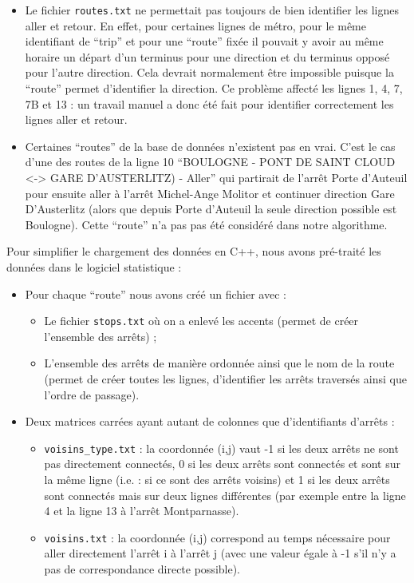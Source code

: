 \documentclass[,french]{article}
\begin{document}
\begin{itemize}
\item
  Le fichier \texttt{routes.txt} ne permettait pas toujours de bien
  identifier les lignes aller et retour. En effet, pour certaines lignes
  de métro, pour le même identifiant de ``trip'' et pour une ``route''
  fixée il pouvait y avoir au même horaire un départ d'un terminus pour
  une direction et du terminus opposé pour l'autre direction. Cela
  devrait normalement être impossible puisque la ``route'' permet
  d'identifier la direction. Ce problème affecté les lignes 1, 4, 7, 7B
  et 13 : un travail manuel a donc été fait pour identifier correctement
  les lignes aller et retour.
\item
  Certaines ``routes'' de la base de données n'existent pas en vrai.
  C'est le cas d'une des routes de la ligne 10 ``BOULOGNE - PONT DE
  SAINT CLOUD \textless{}-\textgreater{} GARE D'AUSTERLITZ) - Aller''
  qui partirait de l'arrêt Porte d'Auteuil pour ensuite aller à l'arrêt
  Michel-Ange Molitor et continuer direction Gare D'Austerlitz (alors
  que depuis Porte d'Auteuil la seule direction possible est Boulogne).
  Cette ``route'' n'a pas pas été considéré dans notre algorithme.
\end{itemize}

Pour simplifier le chargement des données en C++, nous avons pré-traité
les données dans le logiciel statistique \faRProject :

\begin{itemize}
\item
  Pour chaque ``route'' nous avons créé un fichier avec :

  \begin{itemize}
  \item
    Le fichier \texttt{stops.txt} où on a enlevé les accents (permet de
    créer l'ensemble des arrêts) ;
  \item
    L'ensemble des arrêts de manière ordonnée ainsi que le nom de la
    route (permet de créer toutes les lignes, d'identifier les arrêts
    traversés ainsi que l'ordre de passage).
  \end{itemize}
\item
  Deux matrices carrées ayant autant de colonnes que d'identifiants
  d'arrêts :

  \begin{itemize}
  \item
    \texttt{voisins\_type.txt} : la coordonnée (i,j) vaut -1 si les deux
    arrêts ne sont pas directement connectés, 0 si les deux arrêts sont
    connectés et sont sur la même ligne (i.e. : si ce sont des arrêts
    voisins) et 1 si les deux arrêts sont connectés mais sur deux lignes
    différentes (par exemple entre la ligne 4 et la ligne 13 à l'arrêt
    Montparnasse).
  \item
    \texttt{voisins.txt} : la coordonnée (i,j) correspond au temps
    nécessaire pour aller directement l'arrêt i à l'arrêt j (avec une
    valeur égale à -1 s'il n'y a pas de correspondance directe
    possible).
  \end{itemize}
\end{itemize}
\end{document}
